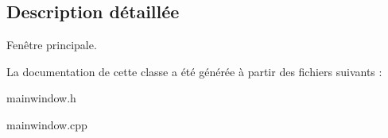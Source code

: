 \subsection{Description détaillée}
Fenêtre principale. 

La documentation de cette classe a été générée à partir des fichiers suivants \-:\begin{DoxyCompactItemize}
\item 
mainwindow.\-h\item 
mainwindow.\-cpp\end{DoxyCompactItemize}
